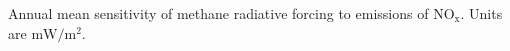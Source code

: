 Annual mean sensitivity of methane radiative forcing to emissions of $\mathrm{NO_x}$. Units are $\mathrm{mW/m^2}$.\label{fig:drfdenox}